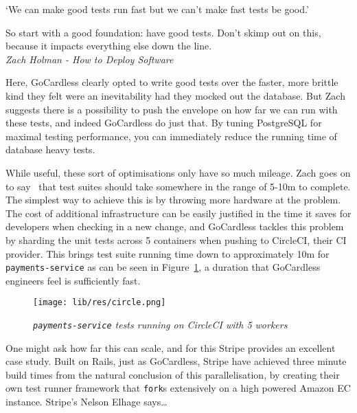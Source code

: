 \documentclass[11pt]{article}
\begin{document}
\begin{displayquote}

  `We can make good tests run fast but we can't make fast tests be good.'

  So start with a good foundation: have good tests. Don't skimp out on this,
  because it impacts everything else down the line. \\

  \textit{Zach Holman - How to Deploy Software~\cite{howToDeploySoftware}}

\end{displayquote}

Here, GoCardless clearly opted to write good tests over the faster, more brittle
kind they felt were an inevitability had they mocked out the database. But Zach
suggests there is a possibility to push the envelope on how far we can run
with these tests, and indeed GoCardless do just that. By tuning PostgreSQL for
maximal testing performance, you can immediately reduce the running time of
database heavy tests.

While useful, these sort of optimisations only have so much mileage. Zach goes
on to say~\cite{howToDeploySoftware} that test suites should take somewhere in
the range of 5-10m to complete. The simplest way to achieve this is by throwing
more hardware at the problem. The cost of additional infrastructure can be
easily justified in the time it saves for developers when checking in a new
change, and GoCardless tackles this problem by sharding the unit tests across 5
containers when pushing to CircleCI, their CI provider. This brings test suite
running time down to approximately 10m for \texttt{payments-service} as can be
seen in Figure~\ref{fig:circle}, a duration that GoCardless engineers feel is
sufficiently fast.

\begin{figure}
\centering
\texttt{[image: lib/res/circle.png]}
\caption{\label{fig:circle}\textit{\texttt{payments-service} tests running on
CircleCI with 5 workers}}
\end{figure}

One might ask how far this can scale, and for this Stripe provides an excellent
case study. Built on Rails, just as GoCardless, Stripe have achieved three
minute build times from the natural conclusion of this parallelisation, by
creating their own test runner framework that \texttt{fork}s extensively on a
high powered Amazon EC instance. Stripe's Nelson Elhage says\dots
\end{document}
